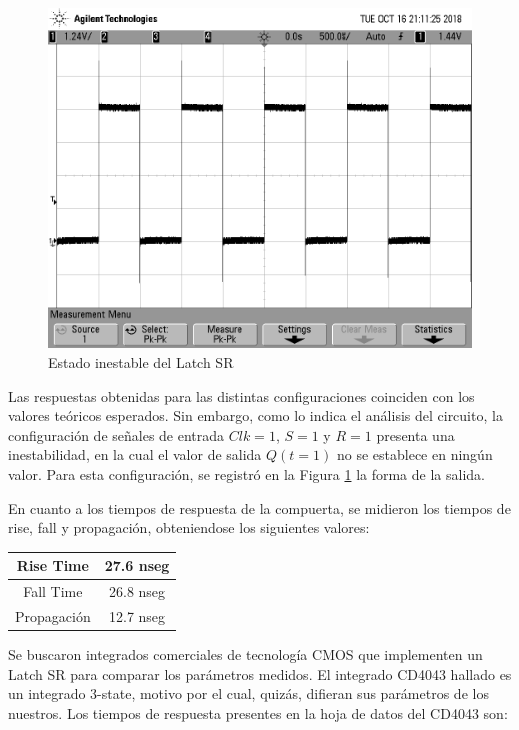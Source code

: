 \begin{figure}[H]
\begin{center}
\includegraphics[scale=0.15]{ejercicio6/sr_1.png}
\caption{Estado inestable del Latch SR} \label{6_fig4}
\end{center}
\end{figure}

Las respuestas obtenidas para las distintas configuraciones coinciden con los valores teóricos esperados. Sin embargo, como lo indica el análisis del circuito, la configuración de señales de entrada $Clk=1$, $S=1$ y $R=1$ presenta una inestabilidad, en la cual el valor de salida $Q(t=1)$ no se establece en ningún valor. Para esta configuración, se registró en la Figura \ref{6_fig4} la forma de la salida.

En cuanto a los tiempos de respuesta de la compuerta, se midieron los tiempos de rise, fall y propagación, obteniendose los siguientes valores:

\begin{center}
\begin{tabular}{|c|c|}
\hline 
Rise Time & 27.6 nseg \\ 
\hline 
Fall Time & 26.8 nseg \\ 
\hline 
Propagación & 12.7 nseg \\ 
\hline 
\end{tabular} 
\end{center}

Se buscaron integrados comerciales de tecnología CMOS que implementen un Latch SR para comparar los parámetros medidos. El integrado CD4043 hallado es un integrado 3-state, motivo por el cual, quizás, difieran sus parámetros de los nuestros. Los tiempos de respuesta presentes en la hoja de datos del CD4043 son:

